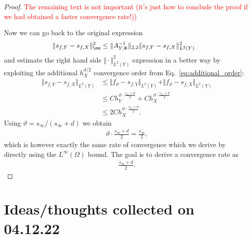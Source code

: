 \documentclass[a4paper, 10pt]{article}
\begin{document}
\begin{proof}
\textcolor{red}{The remaining text is not important (it's just how to conclude the proof if we had obtained a faster convergence rate!))}

Now we can go back to the original expression
\begin{align*}
\Vert s_{f, Y} - s_{f, X} \Vert_{\ns}^2 &\leq \Vert A_{Y, \Phi}^{-1} \Vert_{2,2} \Vert s_{f, Y} - s_{f, X} \Vert_{L^2(Y)}^2
\end{align*}
and estimate the right hand side $\Vert \cdot \Vert_{L^2(Y)}^2$ expression in a better way by exploiting the additional $h_X^{d/2}$ convergence order from Eq.\ \eqref{eq:additional_order}:
\begin{align*}
\Vert s_{f, Y} - s_{f, X} \Vert_{L^2(Y)} &\leq \Vert f_\vartheta - s_{f, Y} \Vert_{L^2(Y)} + \Vert f_\vartheta - s_{f, X} \Vert_{L^2(Y)} \\
&\leq C h_Y^{\vartheta \cdot \frac{s_\infty + d}{2}} + C h_X^{\vartheta \cdot \frac{s_\infty + d}{2}} \\
&\leq 2C h_X^{\vartheta \cdot \frac{s_\infty + d}{2}}.
\end{align*}
Using $\vartheta = s_\infty / (s_\infty + d)$ we obtain 
\begin{align*}
\vartheta \cdot \frac{s_\infty + d}{2} = \frac{s_\infty}{2},
\end{align*}
which is however exactly the same rate of convergence which we derive by directly using the $L^\infty(\Omega)$ bound.
The goal is to derive a convergence rate as
\begin{align*}
\frac{s_\infty + d}{2}.
\end{align*}
\end{proof}


\section{Ideas/thoughts collected on 04.12.22}
\end{document}

